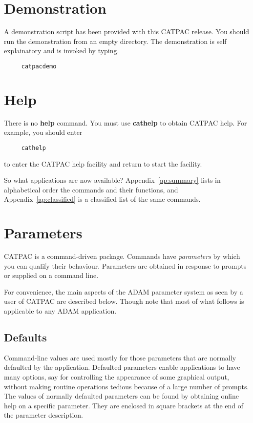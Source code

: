 \section{Demonstration}
A demonstration script has been provided with this CATPAC release. You should
run the demonstration from an empty directory. The demonstration is self
explainatory and is invoked by typing.

\begin{verbatim}
     catpacdemo
\end{verbatim}

\section{Help}

There is no {\bf help} command.  You must use {\bf cathelp} to
obtain {\sc CATPAC} help.  For example, you should enter

\begin{verbatim}
     cathelp
\end{verbatim}

to enter the CATPAC help facility and return to start the facility.


So what applications are now available?  Appendix~\ref{ap:summary} lists
in alphabetical order the commands and their functions, and
Appendix~\ref{ap:classified} is a classified list of the same commands.


\section{Parameters}
\label{se:param}

{\small CATPAC} is a command-driven package.  Commands have {\em parameters\/}
by which you can qualify their behaviour. Parameters are obtained in response
to prompts or supplied on a command line.

For convenience, the main aspects of the {\small ADAM} parameter system
as seen by a user of {\small CATPAC} are described below.  Though note
that most of what follows is applicable to any {\small ADAM}
application.

\subsection{Defaults}
\label{se:defaults}

Command-line values are used mostly for those parameters that are normally
defaulted by the application.   Defaulted parameters enable applications to
have many options, say for controlling the appearance of some graphical output,
without making routine operations tedious because of a large number of prompts.
The values of normally defaulted parameters can be found by obtaining online
help on a specific parameter.  They are enclosed in square brackets at the end
of the parameter description.

